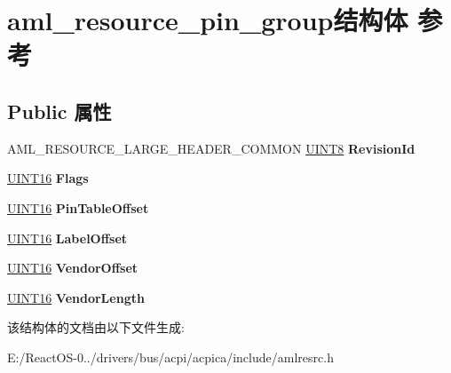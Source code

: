 \hypertarget{structaml__resource__pin__group}{}\section{aml\+\_\+resource\+\_\+pin\+\_\+group结构体 参考}
\label{structaml__resource__pin__group}
\subsection*{Public 属性}
\begin{DoxyCompactItemize}
\item 
\mbox{\label{structaml__resource__pin__group_a7b4b69f3f944e1b5c270530e6b919b72}} 
A\+M\+L\+\_\+\+R\+E\+S\+O\+U\+R\+C\+E\+\_\+\+L\+A\+R\+G\+E\+\_\+\+H\+E\+A\+D\+E\+R\+\_\+\+C\+O\+M\+M\+ON \hyperlink{_processor_bind_8h_ab27e9918b538ce9d8ca692479b375b6a}{U\+I\+N\+T8} {\bfseries Revision\+Id}
\item 
\mbox{\label{structaml__resource__pin__group_a5184724657cf1b762c519aec963beea9}} 
\hyperlink{_processor_bind_8h_a09f1a1fb2293e33483cc8d44aefb1eb1}{U\+I\+N\+T16} {\bfseries Flags}
\item 
\mbox{\label{structaml__resource__pin__group_a6abd9e880eee5c218930b0790f2cfd8b}} 
\hyperlink{_processor_bind_8h_a09f1a1fb2293e33483cc8d44aefb1eb1}{U\+I\+N\+T16} {\bfseries Pin\+Table\+Offset}
\item 
\mbox{\label{structaml__resource__pin__group_a74f066f042d21ca0012bb7420f3dc01c}} 
\hyperlink{_processor_bind_8h_a09f1a1fb2293e33483cc8d44aefb1eb1}{U\+I\+N\+T16} {\bfseries Label\+Offset}
\item 
\mbox{\label{structaml__resource__pin__group_a400cd576b509fc58f50a70c57ec004d6}} 
\hyperlink{_processor_bind_8h_a09f1a1fb2293e33483cc8d44aefb1eb1}{U\+I\+N\+T16} {\bfseries Vendor\+Offset}
\item 
\mbox{\label{structaml__resource__pin__group_ac82d7dbe1c819d87bb8b3705a5c7813c}} 
\hyperlink{_processor_bind_8h_a09f1a1fb2293e33483cc8d44aefb1eb1}{U\+I\+N\+T16} {\bfseries Vendor\+Length}
\end{DoxyCompactItemize}


该结构体的文档由以下文件生成\+:\begin{DoxyCompactItemize}
\item 
E\+:/\+React\+O\+S-\/0../drivers/bus/acpi/acpica/include/amlresrc.\+h\end{DoxyCompactItemize}
